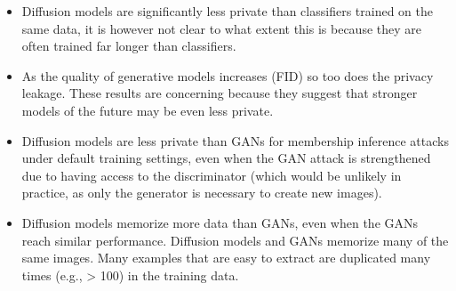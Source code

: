 \documentclass{article}
\begin{document}
\begin{itemize}
    \item Diffusion models are significantly less private than classifiers trained on the same data, it is however not clear to what extent this is because they are often trained far longer than classifiers.
    \item As the quality of generative models increases (FID) so too does the privacy leakage. These results are concerning because they suggest that stronger models of the future may be even less private.
    \item Diffusion models are less private than GANs for membership inference attacks under default training settings, even when the GAN attack is strengthened due to having access to the discriminator (which would be unlikely in practice, as only the generator is necessary to create new images).
    \item Diffusion models memorize more data than GANs, even when the GANs reach similar performance. Diffusion models and GANs memorize many of the same images. Many examples that are easy to extract are duplicated many times (e.g., > 100) in the training data.
\end{itemize}
\end{document}
